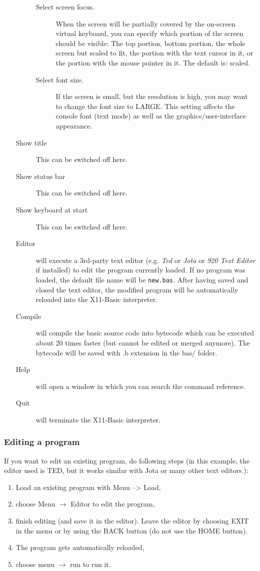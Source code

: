 \begin{itemize}
\begin{description}
\begin{description}
\item[Select screen focus.] When the screen will be partially covered by the 
    on-screen virtual keyboard, you can specify which portion of the screen 
    should be visible: The top portion, bottom portion, the whole screen but 
    scaled to fit, the portion with the text cursor in it, or the portion with 
    the mouse pointer in it. The default is: scaled.
\item[Select font size.] If the screen is small, but the resolution is high, 
you may want to change the font size to LARGE. This setting affects the 
console font (text mode) as well as the graphics/user-interface appearance.
\end{description}
\item[Show title] This can be switched off here.
\item[Show status bar] This can be switched off here.
\item[Show keyboard at start] This can be switched off here.
\item[Editor] will execute a 3rd-party text editor (e.g. {\it Ted} or 
{\it Jota} or {\it 920 Text Editor} if installed) to edit the program currently 
loaded. If no program 
was loaded, the default file name will be \verb|new.bas|. After having saved 
and closed the text editor, the modified program will be automatically 
reloaded into the X11-Basic interpreter.
\item[Compile] will compile the basic source code into bytecode which can be 
executed about 20 times faster (but cannot be edited or merged anymore). 
The bytecode will be saved with .b extension in the bas/ folder.
\item[Help] will open a window in which you can search the command reference.
\item[Quit] will terminate the X11-Basic interpreter.
\end{description}
\end{itemize}

\subsubsection*{Editing a program}
If you want to edit an existing program, do following steps (in this example, the editor used is TED, but it works similar with
Jota or many other text editors.):
\begin{enumerate}
\item Load an existing program with Menu --> Load,
\item choose Menu $\rightarrow$ Editor to edit the program, 
\item finish editing (and save it in the editor). Leave the editor by choosing EXIT in the menu or by using the BACK button (do not use the HOME button).
\item The program gets automatically reloaded, 
\item choose menu $\rightarrow$ run to run it.
\end{enumerate}

